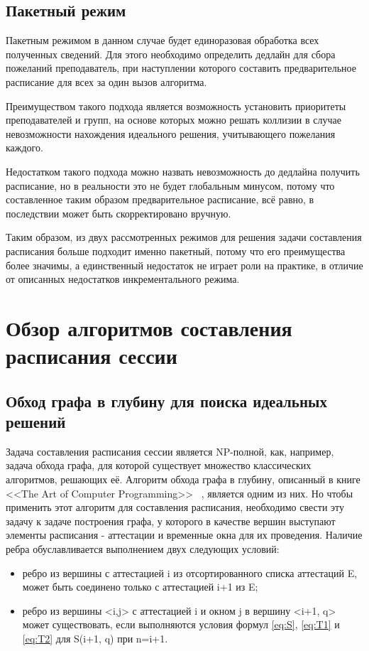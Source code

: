 \subsection{Пакетный режим}

Пакетным режимом в данном случае будет единоразовая обработка всех полученных сведений. Для этого необходимо определить дедлайн для сбора пожеланий преподаватель, при наступлении которого составить предварительное расписание для всех за один вызов алгоритма. 

Преимуществом такого подхода является возможность установить приоритеты преподавателей и групп, на основе которых можно решать коллизии в случае невозможности нахождения идеального решения, учитывающего пожелания каждого. 

Недостатком такого подхода можно назвать невозможность до дедлайна получить расписание, но в реальности это не будет глобальным минусом, потому что составленное таким образом предварительное расписание, всё равно, в последствии может быть скорректировано вручную. 

Таким образом, из двух рассмотренных режимов для решения задачи составления расписания больше подходит именно пакетный, потому что его преимущества более значимы, а единственный недостаток не играет роли на практике, в отличие от описанных недостатков инкрементального режима.

\section{Обзор алгоритмов составления расписания сессии} \label{ch2:sec3} 
\subsection{Обход графа в глубину для поиска идеальных решений}

Задача составления расписания сессии является NP-полной, как, например, задача обхода графа, для которой существует множество классических алгоритмов, решающих её. Алгоритм обхода графа в глубину, описанный в книге <<The Art of Computer Programming>> ~\cite{dfs}, является одним из них.  Но чтобы применить этот алгоритм для составления расписания, необходимо свести эту задачу к задаче построения графа, у которого в качестве вершин выступают элементы расписания - аттестации и временные окна для их проведения. Наличие ребра обуславливается выполнением двух следующих условий:
\begin{itemize}
	\item ребро из вершины с аттестацией i из отсортированного списка аттестаций E, может быть соединено только с аттестацией i+1 из E;
	\item ребро из вершины <i,j> с аттестацией i и окном j в вершину <i+1, q> может существовать, если выполняются условия формул \eqref{eq:S}, \eqref{eq:T1} и \eqref{eq:T2} для S(i+1, q) при n=i+1.
\end{itemize}


